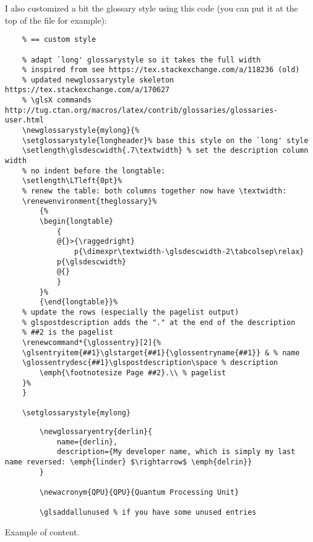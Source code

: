 I also customized a bit the glossary style using this code (you can put it at the top of the  file for example):

\begin{verbatim}
    % == custom style

    % adapt `long' glossarystyle so it takes the full width
    % inspired from see https://tex.stackexchange.com/a/118236 (old)
    % updated newglossarystyle skeleton https://tex.stackexchange.com/a/170627
    % \glsX commands http://tug.ctan.org/macros/latex/contrib/glossaries/glossaries-user.html
    \newglossarystyle{mylong}{%
    \setglossarystyle{longheader}% base this style on the `long' style
    \setlength\glsdescwidth{.7\textwidth} % set the description column width
    % no indent before the longtable:
    \setlength\LTleft{0pt}%
    % renew the table: both columns together now have \textwidth:
    \renewenvironment{theglossary}%
        {%
        \begin{longtable}
            {
            @{}>{\raggedright}
                p{\dimexpr\textwidth-\glsdescwidth-2\tabcolsep\relax}
            p{\glsdescwidth}
            @{}
            }
        }%
        {\end{longtable}}%
    % update the rows (especially the pagelist output)
    % glspostdescription adds the "." at the end of the description
    % ##2 is the pagelist
    \renewcommand*{\glossentry}[2]{%
    \glsentryitem{##1}\glstarget{##1}{\glossentryname{##1}} & % name
    \glossentrydesc{##1}\glspostdescription\space % description
        \emph{\footnotesize Page ##2}.\\ % pagelist
    }%
    }

    \setglossarystyle{mylong}
\end{verbatim}

\begin{listing}[ht!]
    \begin{verbatim}
        \newglossaryentry{derlin}{
            name={derlin},
            description={My developer name, which is simply my last name reversed: \emph{linder} $\rightarrow$ \emph{delrin}}
        }
        
        \newacronym{QPU}{QPU}{Quantum Processing Unit}

        \glsaddallunused % if you have some unused entries
    \end{verbatim}
    \caption{Example of  content.}
    \label{lst:glossaries}
\end{listing}